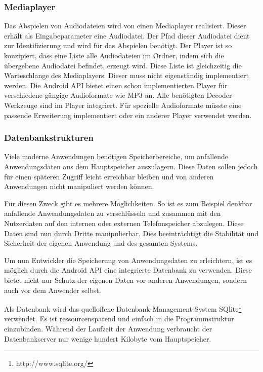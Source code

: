 \subsubsection{Mediaplayer}

Das Abspielen von Audiodateien wird von einen Mediaplayer realisiert. Dieser erhält als Eingabeparameter eine Audiodatei. Der Pfad dieser Audiodatei dient zur Identifizierung und wird für das Abspielen benötigt. Der Player ist so konzipiert, dass eine Liste alle Audiodateien im Ordner, indem sich die übergebene Audiodatei befindet, erzeugt wird. Diese Liste ist gleichzeitig die Warteschlange des Mediaplayers. Dieser muss nicht eigenständig implementiert werden. Die Android API bietet einen schon implementierten Player für verschiedene gängige Audioformate wie MP3 an. Alle benötigten Decoder-Werkzeuge sind im Player integriert. Für spezielle Audioformate müsste eine passende Erweiterung implementiert oder ein anderer Player verwendet werden.

\subsubsection{Datenbankstrukturen}
\label{Datenbankstrukturen}

Viele moderne Anwendungen benötigen Speicherbereiche, um anfallende Anwendungsdaten aus dem Hauptspeicher auszulagern. Diese Daten sollen jedoch für einen späteren Zugriff leicht erreichbar bleiben und von anderen Anwendungen nicht manipuliert werden können.

Für diesen Zweck gibt es mehrere Möglichkeiten. So ist es zum Beispiel denkbar anfallende Anwendungsdaten zu verschlüsseln und zusammen mit den Nutzerdaten auf den internen oder externen Telefonspeicher abzulegen. Diese Daten sind nun durch Dritte manipulierbar. Dies beeinträchtigt die Stabilität und Sicherheit der eigenen Anwendung und des gesamten Systems.

Um nun Entwickler die Speicherung von Anwendungsdaten zu erleichtern, ist es möglich durch die Android API eine integrierte Datenbank zu verwenden. Diese bietet nicht nur Schutz der eigenen Daten vor anderen Anwendungen, sondern auch vor dem Anwender selbst.

Als Datenbank wird das quelloffene Datenbank-Management-System SQlite\footnote{http://www.sqlite.org/} verwendet. Es ist ressourcensparend und einfach in die Programmstruktur einzubinden. Während der Laufzeit der Anwendung verbraucht der Datenbankserver nur wenige hundert Kilobyte vom Hauptspeicher.

